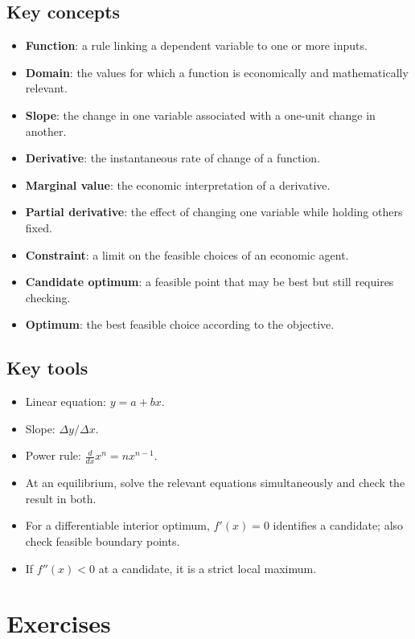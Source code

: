 \subsection*{Key concepts}
\begin{itemize}
  \item \textbf{Function}: a rule linking a dependent variable to one or more inputs.
  \item \textbf{Domain}: the values for which a function is economically and mathematically relevant.
  \item \textbf{Slope}: the change in one variable associated with a one-unit change in another.
  \item \textbf{Derivative}: the instantaneous rate of change of a function.
  \item \textbf{Marginal value}: the economic interpretation of a derivative.
  \item \textbf{Partial derivative}: the effect of changing one variable while holding others fixed.
  \item \textbf{Constraint}: a limit on the feasible choices of an economic agent.
  \item \textbf{Candidate optimum}: a feasible point that may be best but still requires checking.
  \item \textbf{Optimum}: the best feasible choice according to the objective.
\end{itemize}

\subsection*{Key tools}
\begin{itemize}
  \item Linear equation: $y=a+bx$.
  \item Slope: $\Delta y/\Delta x$.
  \item Power rule: $\frac{d}{dx}x^n=nx^{n-1}$.
  \item At an equilibrium, solve the relevant equations simultaneously and check the result in both.
  \item For a differentiable interior optimum, $f'(x)=0$ identifies a candidate; also check feasible boundary points.
  \item If $f''(x)<0$ at a candidate, it is a strict local maximum.
\end{itemize}

\section*{Exercises}

